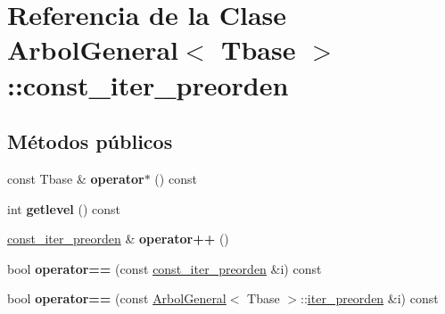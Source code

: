 \hypertarget{class_arbol_general_1_1const__iter__preorden}{}\section{Referencia de la Clase Arbol\+General$<$ Tbase $>$\+:\+:const\+\_\+iter\+\_\+preorden}
\label{class_arbol_general_1_1const__iter__preorden}
\subsection*{Métodos públicos}
\begin{DoxyCompactItemize}
\item 
const Tbase \& {\bfseries operator$\ast$} () const \hypertarget{class_arbol_general_1_1const__iter__preorden_af38089829e757c921f54375a4d899349}{}\label{class_arbol_general_1_1const__iter__preorden_af38089829e757c921f54375a4d899349}

\item 
int {\bfseries getlevel} () const \hypertarget{class_arbol_general_1_1const__iter__preorden_a354a95ddbe9d7c534fdb7930f6d5f580}{}\label{class_arbol_general_1_1const__iter__preorden_a354a95ddbe9d7c534fdb7930f6d5f580}

\item 
\hyperlink{class_arbol_general_1_1const__iter__preorden}{const\+\_\+iter\+\_\+preorden} \& {\bfseries operator++} ()\hypertarget{class_arbol_general_1_1const__iter__preorden_a2210e98aa998197a96ac5b4d45ed64d3}{}\label{class_arbol_general_1_1const__iter__preorden_a2210e98aa998197a96ac5b4d45ed64d3}

\item 
bool {\bfseries operator==} (const \hyperlink{class_arbol_general_1_1const__iter__preorden}{const\+\_\+iter\+\_\+preorden} \&i) const \hypertarget{class_arbol_general_1_1const__iter__preorden_ac79a2f7ebae1c83bee2e87ac70a04c78}{}\label{class_arbol_general_1_1const__iter__preorden_ac79a2f7ebae1c83bee2e87ac70a04c78}

\item 
bool {\bfseries operator==} (const \hyperlink{class_arbol_general}{Arbol\+General}$<$ Tbase $>$\+::\hyperlink{class_arbol_general_1_1iter__preorden}{iter\+\_\+preorden} \&i) const \hypertarget{class_arbol_general_1_1const__iter__preorden_a6a14500129580ead3d6eaa98d76dc2fa}{}\label{class_arbol_general_1_1const__iter__preorden_a6a14500129580ead3d6eaa98d76dc2fa}


\end{DoxyCompactItemize}
